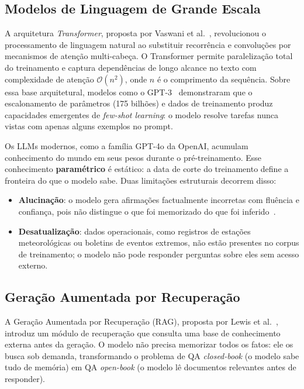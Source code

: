 \documentclass[conference]{IEEEtran}
\begin{document}
\subsection{Modelos de Linguagem de Grande Escala}

A arquitetura \textit{Transformer}, proposta por
Vaswani et al.~\cite{vaswani2017attention}, revolucionou o
processamento de linguagem natural ao substituir recorrência
e convoluções por mecanismos de atenção multi-cabeça.
O Transformer permite paralelização total do treinamento e
captura dependências de longo alcance no texto com complexidade
de atenção $\mathcal{O}(n^2)$, onde $n$ é o comprimento da
sequência.
Sobre essa base arquitetural, modelos como o GPT-3~\cite{brown2020gpt3}
demonstraram que o escalonamento de parâmetros (175 bilhões)
e dados de treinamento produz capacidades emergentes de
\textit{few-shot learning}: o modelo resolve tarefas nunca
vistas com apenas alguns exemplos no prompt.

Os LLMs modernos, como a família GPT-4o da OpenAI, acumulam
conhecimento do mundo em seus pesos durante o pré-treinamento.
Esse conhecimento \textbf{paramétrico} é estático: a data de
corte do treinamento define a fronteira do que o modelo sabe.
Duas limitações estruturais decorrem disso:

\begin{itemize}
  \item \textbf{Alucinação}: o modelo gera afirmações factualmente
        incorretas com fluência e confiança, pois não distingue
        o que foi memorizado do que foi inferido~\cite{gao2024survey}.
  \item \textbf{Desatualização}: dados operacionais, como registros
        de estações meteorológicas ou boletins de eventos extremos,
        não estão presentes no corpus de treinamento; o modelo
        não pode responder perguntas sobre eles sem acesso externo.
\end{itemize}

\subsection{Geração Aumentada por Recuperação}

A Geração Aumentada por Recuperação (RAG), proposta por
Lewis et al.~\cite{lewis2020rag}, introduz um módulo de
recuperação que consulta uma base de conhecimento externa
antes da geração.
O modelo não precisa memorizar todos os fatos: ele os busca
sob demanda, transformando o problema de QA \textit{closed-book}
(o modelo sabe tudo de memória) em QA \textit{open-book}
(o modelo lê documentos relevantes antes de responder).
\end{document}
